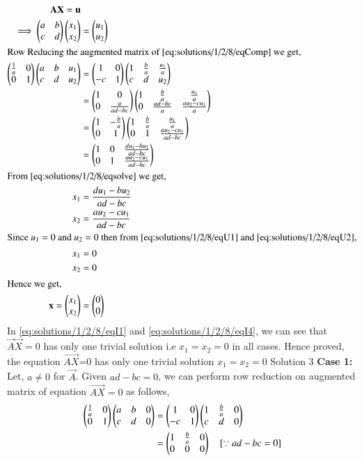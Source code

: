 \begin{align}
\mathbf{A}\mathbf{X} = \mathbf{u}\\
\implies\begin{pmatrix}a&b\\c&d\end{pmatrix}\begin{pmatrix}x_1\\x_2\end{pmatrix} &=\begin{pmatrix}u_1\\u_2\end{pmatrix}\label{eq:solutions/1/2/8/eqComp}\\
\intertext{Row Reducing the augmented matrix of \eqref{eq:solutions/1/2/8/eqComp} we get,}
\begin{pmatrix}\frac{1}{a}&0\\0&1\end{pmatrix}\begin{pmatrix}a&b&u_1\\c&d&u_2\end{pmatrix}&=\begin{pmatrix}1&0\\-c&1\end{pmatrix}\begin{pmatrix}1&\frac{b}{a}&\frac{u_1}{a}\\c&d&u_2\end{pmatrix}\\
&=\begin{pmatrix}1&0\\0&\frac{a}{ad-bc}\end{pmatrix}\begin{pmatrix}1&\frac{b}{a}&\frac{u_1}{a}\\0&\frac{ad-bc}{a}&\frac{au_2-cu_1}{a}\end{pmatrix}\\
&=\begin{pmatrix}1&-\frac{b}{a}\\0&1\end{pmatrix}\begin{pmatrix}1&\frac{b}{a}&\frac{u_1}{a}\\0&1&\frac{au_2-cu_1}{ad-bc}\end{pmatrix}\\
&=\begin{pmatrix}1&0&\frac{du_1-bu_2}{ad-bc}\\0&1&\frac{au_2-cu_1}{ad-bc}\end{pmatrix}\label{eq:solutions/1/2/8/eqsolve}\\
\intertext{From \eqref{eq:solutions/1/2/8/eqsolve} we get,}
x_1 &= \frac{du_1-bu_2}{ad-bc}\label{eq:solutions/1/2/8/eqU1}\\
x_2 &= \frac{au_2-cu_1}{ad-bc}\label{eq:solutions/1/2/8/eqU2}\\
\intertext{Since $u_1 = 0$ and $u_2 = 0$ then from \eqref{eq:solutions/1/2/8/eqU1} and \eqref{eq:solutions/1/2/8/eqU2},}
x_1 & = 0\\
x_2 & = 0\\
\intertext{Hence we get,}
\mathbf{x} = \begin{pmatrix}x_1\\x_2\end{pmatrix} &= \begin{pmatrix}0\\0\end{pmatrix}\label{eq:solutions/1/2/8/eqI4}
\end{align}
In \eqref{eq:solutions/1/2/8/eqI1} and \eqref{eq:solutions/1/2/8/eqI4}, we can see that $\vec{A}\vec{X}=0$ has only one trivial solution i.e $x_1=x_2=0$ in all cases. Hence proved, the equation $\vec{AX}$=0 has only one trivial solution $x_1=x_2=0$
{Solution 3}
\textbf{Case 1: }Let, $a\not=0$ for $\vec{A}$. Given $ad-bc=0$, we can perform row reduction on augmented matrix of equation $\vec{AX}=0$ as follows,
\begin{align}
\begin{pmatrix}\frac{1}{a}&0\\0&1\end{pmatrix}\begin{pmatrix}a&b&0\\c&d&0\end{pmatrix}&=\begin{pmatrix}1&0\\-c&1\end{pmatrix}\begin{pmatrix}1&\frac{b}{a}&0\\c&d&0\end{pmatrix}\\
&=\begin{pmatrix}1&\frac{b}{a}&0\\0&0&0\end{pmatrix}\quad{\text{[$\because ad-bc=0$]}}\label{eq:solutions/1/2/8/eqL3}
\end{align}
